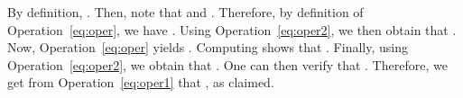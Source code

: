 \documentclass{CSML}
\newcommand{\fo}{\ensuremath{\text{FO}}\xspace}
\newcommand\foeq[1]{\ensuremath{\equiv_{#1}}\xspace}
\theoremstyle{plain}
\begin{document}
\smallskip

By definition, . Then, note that
 and . Therefore, by
definition of Operation~\ref{eq:oper}, we have
.  Using Operation~\ref{eq:oper2}, we then
obtain that .
Now, Operation~\ref{eq:oper} yields . Computing  shows that .
Finally, using Operation~\ref{eq:oper2}, we obtain that . One can then verify that
. Therefore, we get from
Operation~\ref{eq:oper1} that , as claimed.

\begin{comment}
  In this section, we state and prove our main result: \fo-separability
  is decidable. This result is twofold. First we prove that a bound 
  can be computed from the input languages such that if there exists a
  separator, it can be chosen with quantifier rank at most
  . This provides a description of the potential separator as well as
  a first algorithm for testing \fo-separability. Indeed, the algorithm
  only needs to test whether there exists one language that is a
  separator within the finitely many  languages.

  The second part of our result is a more efficient algorithm
  that tests \fo-separability. While more efficient than the brute-force
  approach discussed above, this algorithm still runs in exponential
  time in the size of the syntactic semigroups of the
  languages. Moreover, it only provides a binary answer without actually
  giving a separator.

  The section is divided into two subsections. In the first one, we
  present our algorithm for testing \fo-separability. In the second
  one, we state our main theorem and analyze its consequences. Note
  that the first section only contains the definition of the algorithm
  and not its correctness proof, which is part of the theorem.

  \subsection{\fo-intersection}

  Fix two regular languages  over . Let  be their product
  semigroup and  be the corresponding morphism. We set
   and .

  The main idea behind the algorithm is the following. Given a natural
  , one associates to each \foeq{k}-class in  the subset of 
  consisting of the images by  of all words in the~class.  It is
  easy to see that  are not -separable if and only if
  there exists such a subset intersecting both  and . As
   gets bigger, these subsets can only get smaller. Therefore, the
  subsets stabilize at some point: there exists  such that subsets
  generated by the \foeq{k}-classes are the same as those generated by
  the \foeq{\ell}-classes for all .  Therefore, if one can compute
  these subsets, one can decide \fo-separability. This is exactly what
  our algorithm does.  In this section, we only give the algorithm.
  Correctness will follow from Theorem \ref{th:fosep}.
\end{comment}
\end{document}
